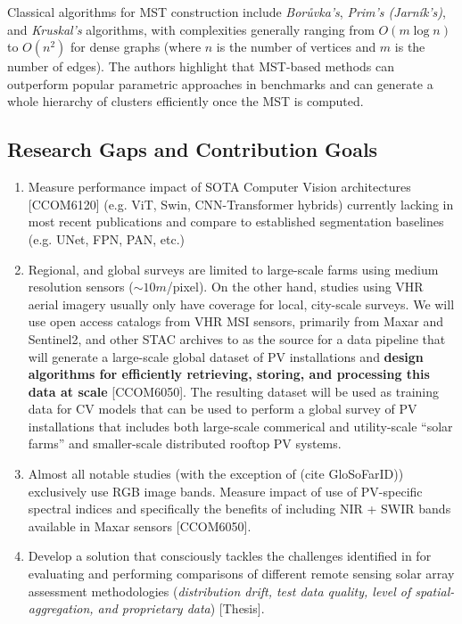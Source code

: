 \begin{multicols}{2}
Classical algorithms for MST construction include \textit{Borůvka's}, \textit{Prim's (Jarník's)}, and \textit{Kruskal's} algorithms, with complexities generally ranging from $O(m \log n)$ to $O(n^2)$ for dense graphs 
(where $n$ is the number of vertices and $m$ is the number of edges). The authors highlight that MST-based methods can outperform popular parametric approaches in benchmarks and can generate a whole hierarchy of clusters efficiently once the MST is computed.

\subsection{Research Gaps and Contribution Goals}
    \begin{enumerate}
        \item Measure performance impact of SOTA Computer Vision architectures [CCOM6120] (e.g. ViT, Swin, CNN-Transformer hybrids) currently lacking in most recent publications and compare to established segmentation baselines (e.g. UNet, FPN, PAN, etc.)
        \item Regional, and global surveys are limited to large-scale farms using medium resolution sensors ($\sim10m$/pixel). On the other hand, studies using VHR aerial imagery usually only have coverage for local, city-scale surveys. We will use open access catalogs from VHR MSI sensors, 
        primarily from Maxar and Sentinel2, and other STAC archives to as the source for a data pipeline that will generate a large-scale global dataset of PV installations and \textbf{design algorithms for efficiently retrieving, storing, and processing this data at scale} [CCOM6050]. 
        The resulting dataset will be used as training data for CV models that can be used to perform a global survey of PV installations that includes both large-scale commerical and utility-scale ``solar farms'' and smaller-scale distributed rooftop PV systems.
        \item Almost all notable studies (with the exception of (cite GloSoFarID)) exclusively use RGB image bands. Measure impact of use of PV-specific spectral indices\cite{He_universal_pv_spectral_index_2024} and specifically the benefits of including NIR + SWIR bands available in Maxar sensors [CCOM6050]. 
        \item Develop a solution that consciously tackles the challenges identified in \cite{Hu_solar_array_pitfalls_2022} for evaluating and performing comparisons of different remote sensing solar array assessment methodologies 
        (\textit{distribution drift, test data quality, level of spatial-aggregation, and proprietary data}) [Thesis].
    \end{enumerate}


\end{multicols}
